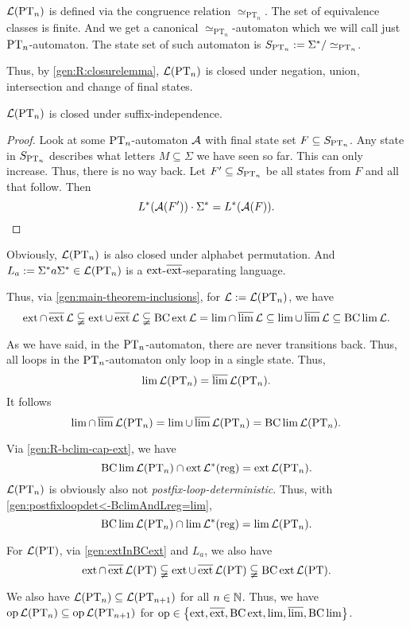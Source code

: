 $\Lang(\PT_n)$ is defined via the congruence relation $\simeq_{\text{PT}_n}$. The set of equivalence classes is finite. And we get a canonical $\simeq_{\text{PT}_n}$-automaton which we will call just $\PT_n$-automaton. The state set of such automaton is $S_{\PT_n} := \Sigma^* / \simeq_{\text{PT}_n}$.

Thus, by \cref{gen:R:closurelemma}, $\Lang(\PT_n)$ is closed under negation, union, intersection and change of final states.

\begin{lemma}
$\Lang(\PT_n)$ is closed under suffix-independence.
\begin{proof}
Look at some $\PT_n$-automaton $\A$ with final state set $F \subseteq S_{\PT_n}$. Any state in $S_{\PT_n}$ describes what letters $M \subseteq \Sigma$ we have seen so far. This can only increase. Thus, there is no way back. Let $F' \subseteq S_{\PT_n}$ be all states from $F$ and all that follow. Then
\[ L^*(\A(F')) \cdot \Sigma^* = L^*(\A(F)) . \]
\end{proof}
\end{lemma}

Obviously, $\Lang(\PT_n)$ is also closed under alphabet permutation. And $L_a := \Sigma^* a \Sigma^* \in \Lang(\PT_n)$ is a $\ext$-$\dext$-separating language.

Thus, via \cref{gen:main-theorem-inclusions}, for $\Lang := \Lang(\PT_n)$, we have
\[ \ext \cap \dext \Lang \subsetneqq
\ext \cup \dext \Lang \subsetneqq
\BC \ext \Lang =
\lim \cap \dlim \Lang \subseteq
\lim \cup \dlim \Lang \subseteq
\BC \lim \Lang . \]

As we have said, in the $\PT_n$-automaton, there are never transitions back. Thus, all loops in the $\PT_n$-automaton only loop in a single state. Thus,
\[ \lim \Lang(\PT_n) = \dlim \Lang(\PT_n) . \]
It follows
\[ \lim \cap \dlim \Lang(\PT_n) =
\lim \cup \dlim \Lang(\PT_n) =
\BC \lim \Lang(\PT_n) . \]

Via \cref{gen:R-bclim-cap-ext}, we have
\[ \BC \lim \Lang(\PT_n) \cap \ext \Langreg = \ext \Lang(\PT_n) . \]
$\Lang(\PT_n)$ is obviously also not \emph{postfix-loop-deterministic}. Thus, with \cref{gen:postfixloopdet<-BclimAndLreg=lim},
\[ \BC \lim \Lang(\PT_n) \cap \lim \Langreg = \lim \Lang(\PT_n) . \]

For $\Lang(\PT)$, via \cref{gen:extInBCext} and $L_a$, we also have
\[ \ext \cap \dext \Lang(\PT) \subsetneqq
\ext \cup \dext \Lang(\PT) \subsetneqq
\BC \ext \Lang(\PT) . \]

We also have $\Lang(\PT_n) \subseteq \Lang(\PT_{n+1})$ for all $n \in \N$. Thus, we have $\operatorname{op} \Lang(\PT_n) \subseteq \operatorname{op} \Lang(\PT_{n+1})$ for $\operatorname{op} \in \Set{\ext, \dext, \BC \ext, \lim,\dlim,\BC \lim}$.

